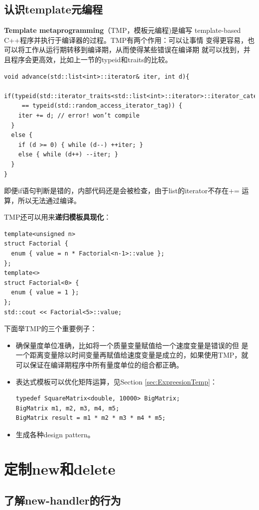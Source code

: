 \documentclass[a4paper,twoside]{article}
\theoremstyle{definition}
\theoremstyle{remark}
\numberwithin{equation}{section}
\begin{document}
\subsection{认识template元编程}
\label{sec:Item-48}

\textbf{Template metaprogramming}（TMP，模板元编程)是编写
template-based C++程序并执行于编译器的过程。TMP有两个作用：可以让事情
变得更容易，也可以将工作从运行期转移到编译期，从而使得某些错误在编译期
就可以找到，并且程序会更高效，比如上一节的typeid和traits的比较。

\begin{verbatim}
void advance(std::list<int>::iterator& iter, int d){
  if(typeid(std::iterator_traits<std::list<int>::iterator>::iterator_category)
     == typeid(std::random_access_iterator_tag)) {
    iter += d; // error! won’t compile
  }
  else {
    if (d >= 0) { while (d--) ++iter; }
    else { while (d++) --iter; }
  }
}
\end{verbatim}

即便if语句判断是错的，内部代码还是会被检查，由于list的iterator不存在+=
运算，所以无法通过编译。

TMP还可以用来\textbf{递归模板具现化}：
\begin{verbatim}
template<unsigned n> 
struct Factorial {
  enum { value = n * Factorial<n-1>::value };
};
template<>
struct Factorial<0> {
  enum { value = 1 };
};
std::cout << Factorial<5>::value;
\end{verbatim}

下面举TMP的三个重要例子：
\begin{itemize}
\item 确保量度单位准确，比如将一个质量变量赋值给一个速度变量是错误的但
  是一个距离变量除以时间变量再赋值给速度变量是成立的，如果使用TMP，就
  可以保证在编译期程序中所有量度单位的组合都正确。
\item 表达式模板可以优化矩阵运算，见Section \ref{sec:ExpreesionTemp}：
\begin{verbatim}
typedef SquareMatrix<double, 10000> BigMatrix;
BigMatrix m1, m2, m3, m4, m5;
BigMatrix result = m1 * m2 * m3 * m4 * m5; 
\end{verbatim}
\item 生成各种design pattern。
\end{itemize}

\clearpage
\section{定制new和delete}

\subsection{了解new-handler的行为}
\label{sec:Item-49}
\end{document}
